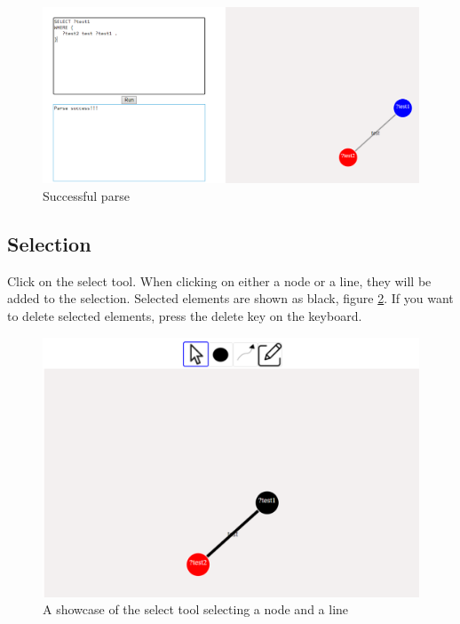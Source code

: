 \begin{figure}[H]
    \centering
    \includegraphics[width=1\textwidth]{figures/visual-query-succ.pdf}
    \caption{Successful parse}
    \label{fig:visual-success}
\end{figure}

\subsection{Selection}
Click on the select tool. When clicking on either a node or a line, they will be added to the selection. Selected elements are shown as black, figure \ref{fig:user-select}. If you want to delete selected elements, press the delete key on the keyboard.
\begin{figure}[H]
    \centering
    \includegraphics{figures/user-select.pdf}
    \caption{A showcase of the select tool selecting a node and a line}
    \label{fig:user-select}
\end{figure}
